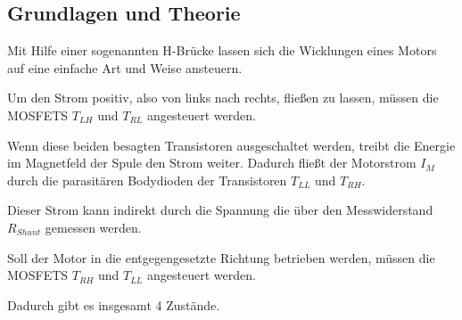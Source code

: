 \subsection{Grundlagen und Theorie}

Mit Hilfe einer sogenannten H-Brücke lassen sich die Wicklungen eines
Motors auf eine einfache Art und Weise ansteuern.

Um den Strom positiv, also von links nach rechts, fließen zu lassen,
müssen die MOSFETS $T_{LH}$ und $T_{RL}$ angesteuert werden.

Wenn diese beiden besagten Transistoren ausgeschaltet werden, treibt die Energie im
Magnetfeld der Spule den Strom weiter. Dadurch fließt der Motorstrom $I_M$
durch die parasitären Bodydioden der Transistoren $T_{LL}$ und $T_{RH}$.

Dieser Strom kann indirekt durch die Spannung die über den Messwiderstand
$R_{Shunt}$ gemessen werden.

Soll der Motor in die entgegengesetzte Richtung betrieben werden, müssen
die MOSFETS $T_{RH}$ und $T_{LL}$ angesteuert werden.

Dadurch gibt es insgesamt 4 Zustände.










